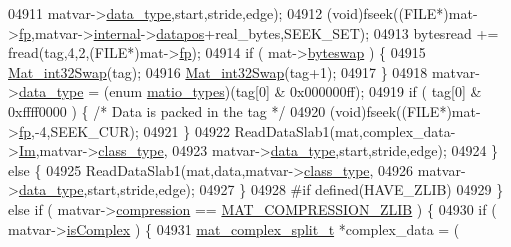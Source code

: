 \begin{DoxyCode}
{{{{{{{{{{{{{{{{{{{{{{{{{{{{{04911                           matvar->\hyperlink{group___m_a_t_ab6aafe9bd77f0f077852593dec438144}{data\_type},start,stride,edge);
04912             (void)fseek((FILE*)mat->\hyperlink{struct__mat__t_a85f562e407ca9ad4d2a6e14f839432b7}{fp},matvar->\hyperlink{group___m_a_t_a6e97e3ed9f40c49322c18561c2a94e92}{internal}->\hyperlink{structmatvar__internal_afd3bfaab126a160bd6855563e1ea0a7e}{datapos}+real\_bytes,SEEK\_SET);
04913             bytesread += fread(tag,4,2,(FILE*)mat->\hyperlink{struct__mat__t_a85f562e407ca9ad4d2a6e14f839432b7}{fp});
04914             \textcolor{keywordflow}{if} ( mat->\hyperlink{struct__mat__t_a99d207977af5e04941ace56d71817a40}{byteswap} ) \{
04915                 \hyperlink{endian_8c_a2e0153996243f0a34df9a5286087cfa3}{Mat\_int32Swap}(tag);
04916                 \hyperlink{endian_8c_a2e0153996243f0a34df9a5286087cfa3}{Mat\_int32Swap}(tag+1);
04917             \}
04918             matvar->\hyperlink{group___m_a_t_ab6aafe9bd77f0f077852593dec438144}{data\_type} = (\textcolor{keyword}{enum} \hyperlink{group___m_a_t_gacf7b3b879282b7ab3a51190e49bf3453}{matio\_types})(tag[0] & 0x000000ff);
04919             \textcolor{keywordflow}{if} ( tag[0] & 0xffff0000 ) \{ \textcolor{comment}{/* Data is packed in the tag */}
04920                 (void)fseek((FILE*)mat->\hyperlink{struct__mat__t_a85f562e407ca9ad4d2a6e14f839432b7}{fp},-4,SEEK\_CUR);
04921             \}
04922             ReadDataSlab1(mat,complex\_data->\hyperlink{group___m_a_t_a7182d10b0d3598415887376065440946}{Im},matvar->\hyperlink{group___m_a_t_aff13035bf3265dd7d9425e5d40c839d4}{class\_type},
04923                           matvar->\hyperlink{group___m_a_t_ab6aafe9bd77f0f077852593dec438144}{data\_type},start,stride,edge);
04924         \} \textcolor{keywordflow}{else} \{
04925             ReadDataSlab1(mat,data,matvar->\hyperlink{group___m_a_t_aff13035bf3265dd7d9425e5d40c839d4}{class\_type},
04926                           matvar->\hyperlink{group___m_a_t_ab6aafe9bd77f0f077852593dec438144}{data\_type},start,stride,edge);
04927         \}
04928 \textcolor{preprocessor}{#if defined(HAVE\_ZLIB)}
04929     \} \textcolor{keywordflow}{else} \textcolor{keywordflow}{if} ( matvar->\hyperlink{group___m_a_t_aeef0466048621cb2c959ba7f6c774d06}{compression} == \hyperlink{group___m_a_t_gga768c318af97bd2567758ecb001ceb7f4a5181d2f71eab0f12f05ba65d4f13fb53}{MAT\_COMPRESSION\_ZLIB} ) \{
04930         \textcolor{keywordflow}{if} ( matvar->\hyperlink{group___m_a_t_aeb03b3a69f108dc05470b00443a43739}{isComplex} ) \{
04931             \hyperlink{group___m_a_t_structmat__complex__split__t}{mat\_complex\_split\_t} *complex\_data = (
}}}}}}}}}}}}}}}}}}}}}}}}}}}}}
\end{DoxyCode}
